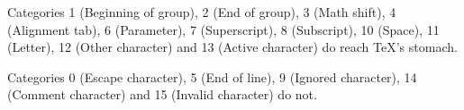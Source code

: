 Categories 1 (Beginning of group), 2 (End of group), 3 (Math shift), 4 (Alignment tab), 6 (Parameter),
7 (Superscript), 8 (Subscript), 10 (Space), 11 (Letter), 12 (Other character) and 13 (Active character)
 do reach \TeX's stomach.

Categories 0 (Escape character), 5 (End of line), 9 (Ignored character), 14 (Comment character)
and 15 (Invalid character) do not.

\bye


